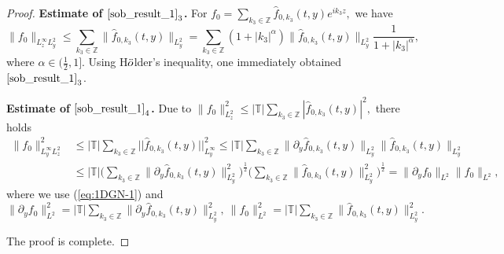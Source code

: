 \documentclass[12pt, reqno]{amsart}
\numberwithin{equation}{section}
\begin{document}
\begin{proof}
		{\bf Estimate of $\eqref{sob_result_1}_3$.}		
		For  $f_{0}=\sum_{k_3\in \mathbb{Z}}\widehat{f}_{0,k_3}(t,y)e^{ik_3z},$
		we have $$\|f_{0}\|_{L^{\infty}_{z}L^2_y}
		\leq \sum_{k_3\in \mathbb{Z}}\|\widehat{f}_{0,k_3}(t,y)\|_{L^2_y}
		= \sum_{k_3\in \mathbb{Z}}(1+|k_3|^{\alpha})\|\widehat{f}_{0,k_3}(t,y)\|_{L^2_y}\frac{1}{1+|k_3|^{\alpha}},$$
		where $\alpha\in(\frac{1}{2},1].$
		Using H$\rm \ddot{o}$lder's inequality, one immediately obtained $\eqref{sob_result_1}_3$.
		
		
		{\bf Estimate of $\eqref{sob_result_1}_4$.}
		Due to $\|f_{0}\|_{L^{2}_{z}}^2
		\leq|\mathbb{T}| \sum_{k_3\in \mathbb{Z}}|\widehat{f}_{0,k_3}(t,y)|^2,$ there holds
		\begin{align*}
			\|f_{0}\|_{L^{\infty}_yL^{2}_{z}}^2
			&\leq |\mathbb{T}|\sum_{k_3\in \mathbb{Z}}||\widehat{f}_{0,k_3}(t,y)||^2_{L^{\infty}_y}
			\leq |\mathbb{T}|\sum_{k_3\in \mathbb{Z}}
			\|\partial_y\widehat{f}_{0,k_3}(t,y)\|_{L^2_y}
			\|\widehat{f}_{0,k_3}(t,y)\|_{L^2_y}\\
			&\leq |\mathbb{T}|\Big(\sum_{k_3\in \mathbb{Z}}
			\|\partial_y\widehat{f}_{0,k_3}(t,y)\|_{L^2_y}^2\Big)^{\frac{1}{2}}
			\Big(\sum_{k_3\in \mathbb{Z}}
			\|\widehat{f}_{0,k_3}(t,y)\|_{L^2_y}^2\Big)^{\frac{1}{2}}
			=\|\partial_yf_0\|_{L^2}\|f_0\|_{L^2},
		\end{align*} 
		where we use (\ref{eq:1DGN-1}) and
		$\|\partial_yf_0\|_{L^2}^{2}=|\mathbb{T}|\sum_{k_3\in \mathbb{Z}}
		\|\partial_y\widehat{f}_{0,k_3}(t,y)\|_{L^2_y}^2,~
		\|f_0\|_{L^2}^{2}=|\mathbb{T}|\sum_{k_3\in \mathbb{Z}}
		\|\widehat{f}_{0,k_3}(t,y)\|_{L^2_y}^2.$
		
		The proof is complete.
	\end{proof}
	
\end{document}
